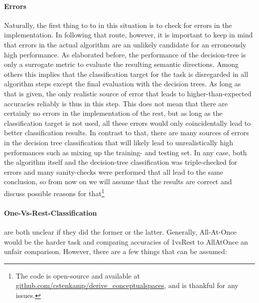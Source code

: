 \paragraph{Errors} 
Naturally, the first thing to to in this situation is to check for errors in the implementation. In following that route, however, it is important to keep in mind that errors in the actual algorithm are an unlikely candidate for an erroneously high performance. As elaborated before, the performance of the decision-tree is only a surrogate metric to evaluate the resulting semantic directions. Among others this implies that the classification target for the task is disregarded in all algorithm steps except the final evaluation with the decision trees. As long as that is given,  the only realistic source of error that leads to higher-than-expected accuracies reliably is thus in this step. This does not mean that there are certainly no errors in the implementation of the rest, but as long as the classification target is not used, all these errors would only coincidentally lead to better classification results. In contrast to that, there are many sources of errors in the decision tree classification that will likely lead to unrealistically high performances such as mixing up the training- and testing set. In any case, both the algorithm itself and the decision-tree classification was triple-checked for errors and many sanity-checks were performed that all lead to the same conclusion, so from now on we will assume that the results are correct and discuss possible reasons for that\footnote{The code is open-source and available at \url{github.com/cstenkamp/derive_conceptualspaces}, and \me is thankful for any issues.}


\paragraph{One-Vs-Rest-Classification}

\cite{Ager2018, Alshaikh2020} are both unclear if they did the former or the latter. Generally, All-At-Once would be the harder task and comparing accuracies of 1vsRest to AllAtOnce an unfair comparison. However, there are a few things that can be assumed:

